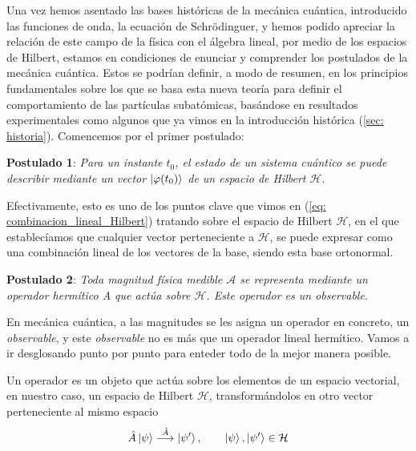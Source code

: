 \documentclass{article}
\numberwithin{equation}{section} %
\begin{document}
    \vspace{5mm}

    Una vez hemos asentado las bases históricas de la mecánica cuántica, introducido las funciones de onda, la ecuación de Schrödinguer, y hemos podido apreciar la relación de este campo de la física con el álgebra lineal, por medio de los espacios de Hilbert, estamos en condiciones de enunciar y comprender los postulados de la mecánica cuántica. Estos se podrían definir, a modo de resumen, en los principios fundamentales sobre los que se basa esta nueva teoría para definir el comportamiento de las partículas subatómicas, basándose en resultados experimentales como algunos que ya vimos en la introducción histórica (\ref{sec: historia}). Comencemos por el primer postulado:
    
    \vspace{7.5mm}

    \textbf{Postulado 1}: \textit{Para un instante \( t_{0} \), el estado de un sistema cuántico se puede describir mediante un vector \( \ket{\varphi(t_{0})} \) de un espacio de Hilbert \( \mathcal{H} \)}.

    \vspace{2.5mm}

    Efectivamente, esto es uno de los puntos clave que vimos en (\ref{eq: combinacion_lineal_Hilbert}) tratando sobre el espacio de Hilbert \( \mathcal{H}\), en el que establecíamos que cualquier vector perteneciente a \( \mathcal{H} \), se puede expresar como una combinación lineal de los vectores de la base, siendo esta base ortonormal.

    \vspace{10mm}

    \textbf{Postulado 2}: \textit{Toda magnitud física medible \( \mathcal{A} \) se representa mediante un operador
    hermítico A que actúa sobre \( \mathcal{H} \). Este operador es un observable}.
    
    \vspace{5mm}

    En mecánica cuántica, a las magnitudes se les asigna un operador en concreto, un \textit{observable}, y este \textit{observable} no es más que un operador lineal hermítico. Vamos a ir desglosando punto por punto para enteder todo de la mejor manera posible.

    \vspace{5mm}

    Un operador es un objeto que actúa sobre los elementos de un espacio vectorial, en nuestro caso, un espacio de Hilbert \( \mathcal{H} \), transformándolos en otro vector perteneciente al mismo espacio
    \begin{equation*}
        \hat{A} \ket{\psi} \overset{\hat{A}}{\longrightarrow} \ket{\psi '}, \qquad \ket{\psi}, \ket{\psi '} \in \mathcal{H}
    \end{equation*}
\end{document}
